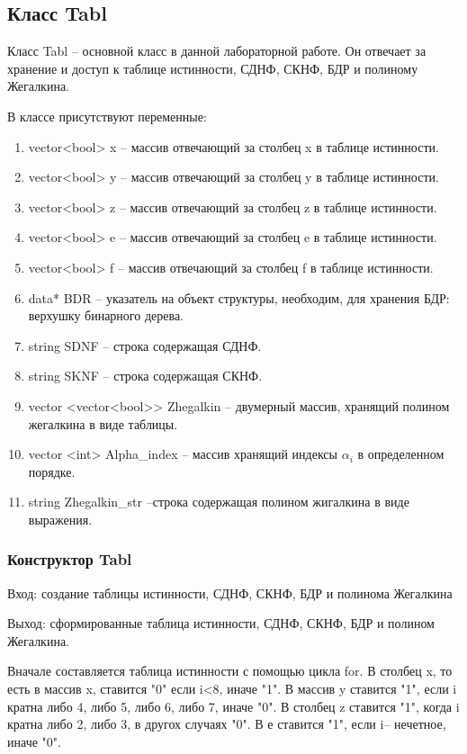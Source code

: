 \documentclass[10pt,a4paper,final]{article} %
\begin{document}
 	

\subsection{Класс Tabl} 
\par Класс Tabl -- основной класс в данной лабораторной работе. Он отвечает за хранение и доступ к таблице истинности, СДНФ, СКНФ, БДР и полиному Жегалкина.
\par В классе присутствуют переменные:
\begin{enumerate}[itemsep=0pt,parsep=0pt,topsep=0pt,partopsep=0pt]
	\item vector<bool> x -- массив отвечающий за столбец x в таблице истинности.
	\item vector<bool> y -- массив отвечающий за столбец y в таблице истинности.
	\item vector<bool> z -- массив отвечающий за столбец z в таблице истинности.
	\item vector<bool> e -- массив отвечающий за столбец e в таблице истинности.
	\item vector<bool> f -- массив отвечающий за столбец f в таблице истинности.
	\item data* BDR -- указатель на объект структуры, необходим, для хранения БДР: верхушку бинарного дерева.
	\item string SDNF -- строка содержащая СДНФ.
	\item string SKNF -- строка содержащая СКНФ.
	\item vector <vector<bool>> Zhegalkin -- двумерный массив, хранящий полином жегалкина в виде таблицы.
	\item vector <int> Alpha\_index -- массив хранящий индексы $\alpha_i$ в определенном порядке.  
	\item string Zhegalkin\_str --строка содержащая полином жигалкина в виде выражения.
\end{enumerate}

\subsubsection{Конструктор Tabl}
\par Вход: создание таблицы истинности, СДНФ, СКНФ, БДР и полинома Жегалкина
\par Выход: сформированные таблица истинности, СДНФ, СКНФ, БДР и полином Жегалкина.
\par Вначале составляется таблица истинности с помощью цикла for. В столбец x, то есть в массив x, ставится "0" если i<8, иначе "1". В массив y ставится "1", если i кратна либо 4, либо 5, либо 6, либо 7, иначе "0". В столбец z ставится "1", когда i кратна либо 2, либо 3, в другох случаях "0". В е ставится "1", если i-- нечетное, иначе "0". 
\end{document}

